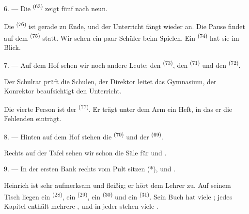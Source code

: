 6. --- Die  \textsuperscript{(63)} zeigt fünf nach neun.

Die  \textsuperscript{(76)} ist gerade zu Ende, und der Unterricht fängt
wieder an. Die Pause findet auf dem  \textsuperscript{(75)} statt. Wir
sehen ein paar Schüler beim Spielen. Ein  \textsuperscript{(74)} hat
sie im Blick.

7. --- Auf dem Hof sehen wir noch andere Leute: den 
\textsuperscript{(73)}, den  \textsuperscript{(71)} und den
 \textsuperscript{(72)}.

Der Schulrat prüft die Schulen, der Direktor leitet das Gymnasium, der Konrektor
beaufsichtigt den Unterricht.

Die vierte Person ist der  \textsuperscript{(77)}. Er trägt unter dem
Arm ein Heft, in das er die Fehlenden einträgt.

8. --- Hinten auf dem Hof stehen die  \textsuperscript{(70)} und der
 \textsuperscript{(69)}.

Rechts auf der Tafel sehen wir schon die Säle für  und
.


\VUsaut{2.4mm}

\VUsaut{3.0mm}

9. --- In der ersten Bank rechts vom Pult sitzen  (*),
 und .

Heinrich ist sehr aufmerksam und fleißig; er hört dem Lehrer zu. Auf seinem
Tisch liegen ein  \textsuperscript{(28)}, ein 
\textsuperscript{(29)}, ein  \textsuperscript{(30)} und ein
 \textsuperscript{(31)}. Sein Buch hat viele ;
jedes Kapitel enthält mehrere , und in jeder  stehen
viele .

